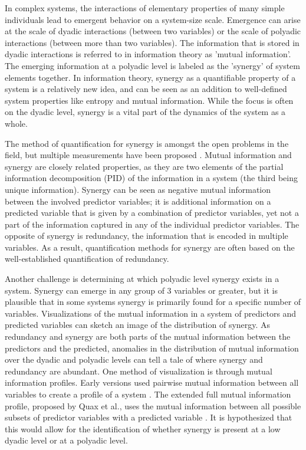 \documentclass[../main.tex]{subfiles}
\begin{document}
In complex systems, the interactions of elementary properties of many simple individuals lead to emergent behavior on a system-size scale.
Emergence can arise at the scale of dyadic interactions (between two variables) or the scale of polyadic interactions (between more than two variables).
The information that is stored in dyadic interactions is referred to in information theory as 'mutual information'.
The emerging information at a polyadic level is labeled as the 'synergy' of system elements together.
In information theory, synergy as a quantifiable property of a system is a relatively new idea, and can be seen as an addition to well-defined system properties like entropy and mutual information.
While the focus is often on the dyadic level, synergy is a vital part of the dynamics of the system as a whole.

The method of quantification for synergy is amongst the open problems in the field, but multiple measurements have been proposed \cite{olbrich2015information}.
Mutual information and synergy are closely related properties, as they are two elements of the partial information decomposition (PID) of the information in a system (the third being unique information).
Synergy can be seen as negative mutual information between the involved predictor variables; it is additional information on a predicted variable that is given by a combination of predictor variables, yet not a part of the information captured in any of the individual predictor variables.
The opposite of synergy is redundancy, the information that is encoded in multiple variables.
As a result, quantification methods for synergy are often based on the well-established quantification of redundancy.

Another challenge is determining at which polyadic level synergy exists in a system.
Synergy can emerge in any group of 3 variables or greater, but it is plausible that in some systems synergy is primarily found for a specific number of variables.
Visualizations of the mutual information in a system of predictors and predicted variables can sketch an image of the distribution of synergy.
As redundancy and synergy are both parts of the mutual information between the predictors and the predicted, anomalies in the distribution of mutual information over the dyadic and polyadic levels can tell a tale of where synergy and redundancy are abundant.
One method of visualization is through mutual information profiles.
Early versions used pairwise mutual information between all variables to create a profile of a system \cite{bar2013computationally}. 
The extended full mutual information profile, proposed by Quax et al., uses the mutual information between all possible subsets of predictor variables with a predicted variable \cite{quax2017quantifying}.
It is hypothesized that this would allow for the identification of whether synergy is present at a low dyadic level or at a polyadic level.
\end{document}
